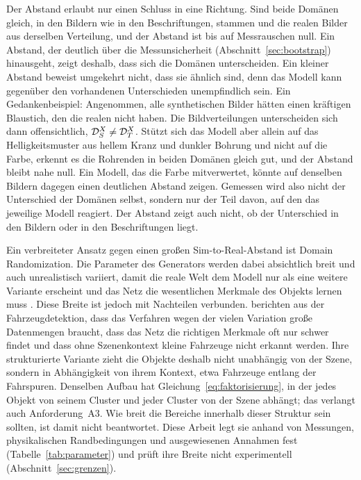 Der Abstand erlaubt nur einen Schluss in eine Richtung. Sind beide Domänen
gleich, in den Bildern wie in den Beschriftungen, stammen  und die
realen Bilder aus derselben Verteilung, und der Abstand ist bis auf Messrauschen
null. Ein Abstand, der deutlich über die Messunsicherheit
(Abschnitt~\ref{sec:bootstrap}) hinausgeht, zeigt deshalb, dass sich die
Domänen unterscheiden. Ein kleiner Abstand beweist umgekehrt nicht, dass sie
ähnlich sind, denn das Modell kann gegenüber den vorhandenen Unterschieden
unempfindlich sein. Ein Gedankenbeispiel: Angenommen, alle synthetischen Bilder
hätten einen kräftigen Blaustich, den die realen nicht haben. Die
Bildverteilungen unterscheiden sich dann offensichtlich,
$\mathcal{D}_{S}^{X} \neq \mathcal{D}_{T}^{X}$. Stützt sich das Modell aber allein auf das
Helligkeitsmuster aus hellem Kranz und dunkler Bohrung und nicht auf die Farbe,
erkennt es die Rohrenden in beiden Domänen gleich gut, und der Abstand bleibt
nahe null. Ein Modell, das die Farbe mitverwertet, könnte auf denselben Bildern
dagegen einen deutlichen Abstand zeigen. Gemessen wird also nicht der
Unterschied der Domänen selbst, sondern nur der Teil davon, auf den das
jeweilige Modell reagiert. Der Abstand zeigt auch nicht, ob der Unterschied in
den Bildern oder in den Beschriftungen liegt.

 Ein verbreiteter Ansatz gegen einen großen
Sim-to-Real-Abstand ist Domain Randomization. Die Parameter des Generators
werden dabei absichtlich breit und auch unrealistisch variiert, damit die reale
Welt dem Modell nur als eine weitere Variante erscheint \parencite{tobin2017}
und das Netz die wesentlichen Merkmale des Objekts lernen muss
\parencite{tremblay2018}. Diese Breite ist jedoch mit Nachteilen verbunden.
\textcite{prakash2019}
berichten aus der Fahrzeugdetektion, dass das Verfahren wegen der vielen
Variation große Datenmengen braucht, dass das Netz die richtigen Merkmale oft
nur schwer findet und dass ohne Szenenkontext kleine Fahrzeuge nicht erkannt
werden. Ihre strukturierte Variante zieht die Objekte deshalb nicht unabhängig
von der Szene, sondern in Abhängigkeit von ihrem Kontext, etwa Fahrzeuge
entlang der Fahrspuren. Denselben Aufbau hat
Gleichung~\eqref{eq:faktorisierung}, in der jedes Objekt von seinem Cluster und
jeder Cluster von der Szene abhängt; das verlangt auch Anforderung~A3. Wie breit
die Bereiche innerhalb dieser Struktur sein sollten, ist damit nicht
beantwortet. Diese Arbeit legt sie anhand von Messungen, physikalischen
Randbedingungen und ausgewiesenen Annahmen fest (Tabelle~\ref{tab:parameter})
und prüft ihre Breite nicht experimentell (Abschnitt~\ref{sec:grenzen}).


